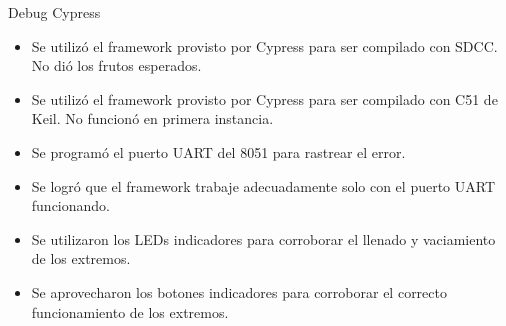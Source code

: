 \begin{frame}{Debug Cypress}
	\begin{itemize}
		\item Se utilizó el framework provisto por Cypress para ser compilado con SDCC. No dió los frutos esperados.
		\item Se utilizó el framework provisto por Cypress para ser compilado con C51 de Keil. No funcionó en primera instancia.
		\item Se programó el puerto UART del 8051 para rastrear el error.
		\item Se logró que el framework trabaje adecuadamente solo con el puerto UART funcionando.
		\item Se utilizaron los LEDs indicadores para corroborar el llenado y vaciamiento de los extremos.
		\item Se aprovecharon los botones indicadores para corroborar el correcto funcionamiento de los extremos.
	\end{itemize}
\end{frame}
